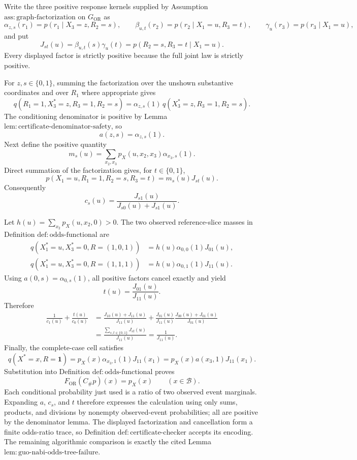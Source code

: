 Write the three positive response kernels supplied by Assumption \(\mathrm{ass{:}graph\text{-}factorization}\) on \(G_{\mathrm{OR}}\) as
\[
\alpha_{z,s}(r_1)=p(r_1\mid X_3=z,R_2=s),\qquad
\beta_{u,t}(r_2)=p(r_2\mid X_1=u,R_3=t),\qquad
\gamma_u(r_3)=p(r_3\mid X_1=u),
\]
and put
\[
J_{st}(u)=\beta_{u,t}(s)\gamma_u(t)
=p(R_2=s,R_3=t\mid X_1=u).
\]
Every displayed factor is strictly positive because the full joint law is strictly positive.

For \(z,s\in\{0,1\}\), summing the factorization over the unshown substantive coordinates and over \(R_1\) where appropriate gives
\[
q(R_1=1,X_3^*=z,R_3=1,R_2=s)
=\alpha_{z,s}(1)\,q(X_3^*=z,R_3=1,R_2=s).
\]
The conditioning denominator is positive by Lemma \(\mathrm{lem{:}certificate\text{-}denominator\text{-}safety}\), so
\[
a(z,s)=\alpha_{z,s}(1).
\]
Next define the positive quantity
\[
m_s(u)=\sum_{x_2,x_3}p_X(u,x_2,x_3)\alpha_{x_3,s}(1).
\]
Direct summation of the factorization gives, for \(t\in\{0,1\}\),
\[
p(X_1=u,R_1=1,R_2=s,R_3=t)=m_s(u)J_{st}(u).
\]
Consequently
\[
c_s(u)=\frac{J_{s1}(u)}{J_{s0}(u)+J_{s1}(u)}.
\]

Let \(h(u)=\sum_{x_2}p_X(u,x_2,0)>0\).  The two observed reference-slice masses in Definition \(\mathrm{def{:}odds\text{-}functional}\) are
\[
\begin{aligned}
q(X_1^*=u,X_3^*=0,R=(1,0,1))&=h(u)\alpha_{0,0}(1)J_{01}(u),\\
q(X_1^*=u,X_3^*=0,R=(1,1,1))&=h(u)\alpha_{0,1}(1)J_{11}(u).
\end{aligned}
\]
Using \(a(0,s)=\alpha_{0,s}(1)\), all positive factors cancel exactly and yield
\[
t(u)=\frac{J_{01}(u)}{J_{11}(u)}.
\]
Therefore
\[
\begin{aligned}
\frac{1}{c_1(u)}+\frac{t(u)}{c_0(u)}
&=\frac{J_{10}(u)+J_{11}(u)}{J_{11}(u)}
 +\frac{J_{01}(u)}{J_{11}(u)}
   \frac{J_{00}(u)+J_{01}(u)}{J_{01}(u)}\\
&=\frac{\sum_{s,t\in\{0,1\}}J_{st}(u)}{J_{11}(u)}
=\frac{1}{J_{11}(u)}.
\end{aligned}
\]
Finally, the complete-case cell satisfies
\[
q(X^*=x,R=\mathbf 1)
=p_X(x)\alpha_{x_3,1}(1)J_{11}(x_1)
=p_X(x)a(x_3,1)J_{11}(x_1).
\]
Substitution into Definition \(\mathrm{def{:}odds\text{-}functional}\) proves
\[
F_{\mathrm{OR}}(C_{\#}p)(x)=p_X(x)
\qquad(x\in\mathcal B).
\]
Each conditional probability just used is a ratio of two observed event marginals.  Expanding \(a\), \(c_s\), and \(t\) therefore expresses the calculation using only sums, products, and divisions by nonempty observed-event probabilities; all are positive by the denominator lemma.  The displayed factorization and cancellation form a finite odds-ratio trace, so Definition \(\mathrm{def{:}certificate\text{-}checker}\) accepts its encoding.  The remaining algorithmic comparison is exactly the cited Lemma \(\mathrm{lem{:}guo\text{-}nabi\text{-}odds\text{-}tree\text{-}failure}\).